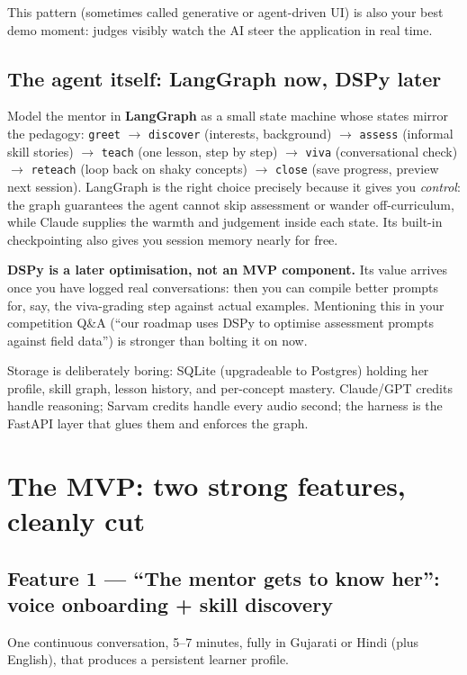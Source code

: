 \documentclass[11pt]{article}
\begin{document}
This pattern (sometimes called generative or agent-driven UI) is also your best demo moment: judges visibly watch the AI steer the application in real time.

\subsection{The agent itself: LangGraph now, DSPy later}

Model the mentor in \textbf{LangGraph} as a small state machine whose states mirror the pedagogy: \texttt{greet} $\rightarrow$ \texttt{discover} (interests, background) $\rightarrow$ \texttt{assess} (informal skill stories) $\rightarrow$ \texttt{teach} (one lesson, step by step) $\rightarrow$ \texttt{viva} (conversational check) $\rightarrow$ \texttt{reteach} (loop back on shaky concepts) $\rightarrow$ \texttt{close} (save progress, preview next session). LangGraph is the right choice precisely because it gives you \emph{control}: the graph guarantees the agent cannot skip assessment or wander off-curriculum, while Claude supplies the warmth and judgement inside each state. Its built-in checkpointing also gives you session memory nearly for free.

\textbf{DSPy is a later optimisation, not an MVP component.} Its value arrives once you have logged real conversations: then you can compile better prompts for, say, the viva-grading step against actual examples. Mentioning this in your competition Q\&A (``our roadmap uses DSPy to optimise assessment prompts against field data'') is stronger than bolting it on now.

Storage is deliberately boring: SQLite (upgradeable to Postgres) holding her profile, skill graph, lesson history, and per-concept mastery. Claude/GPT credits handle reasoning; Sarvam credits handle every audio second; the harness is the FastAPI layer that glues them and enforces the graph.

\section{The MVP: two strong features, cleanly cut}

\subsection{Feature 1 --- ``The mentor gets to know her'': voice onboarding + skill discovery}

One continuous conversation, 5--7 minutes, fully in Gujarati or Hindi (plus English), that produces a persistent learner profile.
\end{document}
